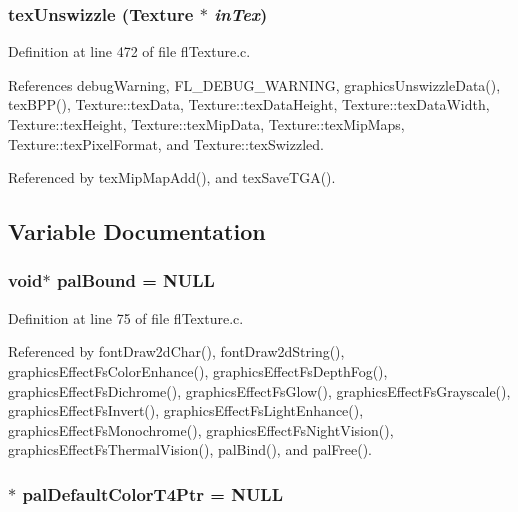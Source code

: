 \subsubsection{ tex\-Unswizzle ({\bf Texture} $\ast$ {\em in\-Tex})}\label{flTexture_8c_9974158b286d32e981d2f00f301c00eb}




Definition at line 472 of file fl\-Texture.c.

References debug\-Warning, FL\_\-DEBUG\_\-WARNING, graphics\-Unswizzle\-Data(), tex\-BPP(), Texture::tex\-Data, Texture::tex\-Data\-Height, Texture::tex\-Data\-Width, Texture::tex\-Height, Texture::tex\-Mip\-Data, Texture::tex\-Mip\-Maps, Texture::tex\-Pixel\-Format, and Texture::tex\-Swizzled.

Referenced by tex\-Mip\-Map\-Add(), and tex\-Save\-TGA().

\subsection{Variable Documentation}
\subsubsection{\setlength{\rightskip}{0pt plus 5cm}void$\ast$ {\bf pal\-Bound} = NULL}\label{flTexture_8c_e67e55c1dd935fedcb7c2fe59b24e832}




Definition at line 75 of file fl\-Texture.c.

Referenced by font\-Draw2d\-Char(), font\-Draw2d\-String(), graphics\-Effect\-Fs\-Color\-Enhance(), graphics\-Effect\-Fs\-Depth\-Fog(), graphics\-Effect\-Fs\-Dichrome(), graphics\-Effect\-Fs\-Glow(), graphics\-Effect\-Fs\-Grayscale(), graphics\-Effect\-Fs\-Invert(), graphics\-Effect\-Fs\-Light\-Enhance(), graphics\-Effect\-Fs\-Monochrome(), graphics\-Effect\-Fs\-Night\-Vision(), graphics\-Effect\-Fs\-Thermal\-Vision(), pal\-Bind(), and pal\-Free().
\subsubsection{$\ast$ {\bf pal\-Default\-Color\-T4Ptr} = NULL}\label{flTexture_8c_2d3cd5972e125488064d6deb08aac5bd}




